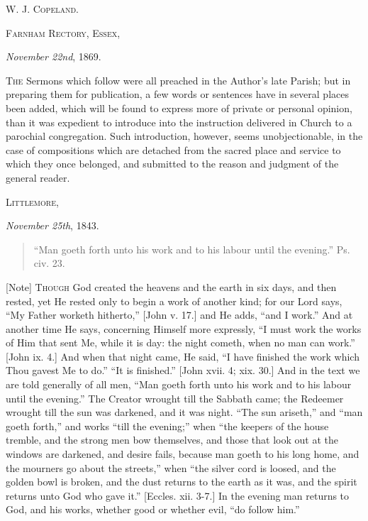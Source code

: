 W. J. C\textsc{opeland}.

F\textsc{arnham} R\textsc{ectory}, E\textsc{ssex},

\emph{November 22nd}, 1869.








T\textsc{he} Sermons which follow were all preached in the Author's late Parish;
but in preparing them for publication, a few words or sentences have
in several places been added, which will be found to express more of
private or personal opinion, than it was expedient to introduce into
the instruction delivered in Church to a parochial congregation. Such
introduction, however, seems unobjectionable, in the case of
compositions which are detached from the sacred place and service to
which they once belonged, and submitted to the reason and judgment of
the general reader.


L\textsc{ittlemore},

\emph{November 25th}, 1843.


\begin{quote}

``Man goeth forth unto his work and to his labour until the
evening.'' Ps. civ. 23.

\end{quote}

[Note] T\textsc{hough} God created the heavens and the earth in six days, and then
rested, yet He rested only to begin a work of another kind; for our
Lord says, ``My Father worketh hitherto,'' [John v. 17.] and
He adds, ``and I work.'' And at another time He says,
concerning Himself more expressly, ``I must work the works of Him
that sent Me, while it is day: the night cometh, when no man can
work.'' [John ix. 4.] And when that night came, He said, ``I
have finished the work which Thou gavest Me to do.'' ``It is
finished.'' [John xvii. 4; xix. 30.] And in the text we are told
generally of all men, ``Man goeth forth unto his work and to his
labour until the evening.'' The Creator wrought till the Sabbath
came; the Redeemer wrought till the sun was darkened, and it was
night. ``The sun ariseth,'' and ``man goeth forth,''
and works ``till the evening;'' when ``the keepers of the
house tremble, and the strong men bow themselves, and those that look
out at the windows are darkened, and desire fails, because man goeth
to his long home, and the mourners go about the streets,'' when
``the silver cord is loosed, and the golden bowl is broken, and
the dust returns to the earth as it was, and the spirit returns unto
God who gave it.'' [Eccles. xii. 3-7.] In the evening man returns
to God, and his works, whether good or whether evil, ``do follow
him.''

